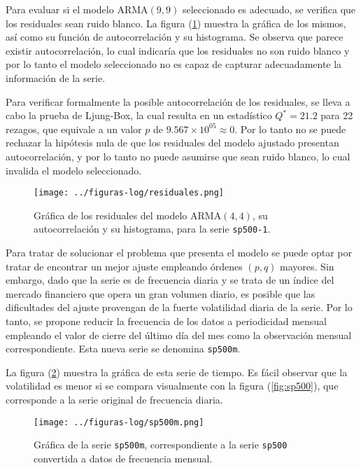 \documentclass{article}
\begin{document}
Para evaluar si el modelo $\mathrm{ARMA}(9, 9)$ seleccionado es adecuado, se verifica que los residuales sean ruido blanco. La figura (\ref{fig:residuales}) muestra la gráfica de los mismos, así como su función de autocorrelación y su histograma. Se observa que parece existir autocorrelación, lo cual indicaría que los residuales no son ruido blanco y por lo  tanto el modelo seleccionado no es capaz de capturar adecuadamente la información de la serie.

Para verificar formalmente la posible autocorrelación de los residuales, se lleva a cabo la prueba de Ljung-Box, la cual resulta en un estadístico $Q^* = 21.2$ para 22 rezagos, que equivale  a un valor $p$ de $9.567 \times 10^{05} \approx 0$. Por lo tanto no se puede rechazar la hipótesis nula de que los residuales del modelo ajustado presentan autocorrelación, y por lo tanto no puede asumirse que sean ruido blanco, lo cual invalida el modelo seleccionado.

\begin{figure}[H]
\centering
\texttt{[image: ../figuras-log/residuales.png]}
\caption{\label{fig:residuales}Gráfica de los residuales del modelo $\mathrm{ARMA(4, 4)}$, su autocorrelación y su histograma, para la serie \texttt{sp500-1}.}
\end{figure}

Para tratar de solucionar el problema que presenta el modelo se puede optar por tratar de encontrar un mejor ajuste empleando órdenes $(p, q)$ mayores. Sin embargo, dado que la serie es de frecuencia diaria y se trata de un índice del mercado financiero que opera un gran volumen diario, es posible que las dificultades del ajuste provengan de la fuerte volatilidad diaria de la serie. Por lo tanto, se propone reducir la frecuencia de los datos a periodicidad mensual empleando el valor de cierre del último día del mes como la observación mensual correspondiente. Esta nueva serie se denomina \texttt{sp500m}.

La figura (\ref{fig:sp500m}) muestra la gráfica de esta serie de tiempo. Es fácil observar que la volatilidad es menor si se compara visualmente con la figura (\ref{fig:sp500}), que corresponde a la serie original de frecuencia diaria.

\begin{figure}[H]
\centering
\texttt{[image: ../figuras-log/sp500m.png]}
\caption{\label{fig:sp500m}Gráfica de la serie \texttt{sp500m}, correspondiente a la serie \texttt{sp500} convertida a datos de frecuencia mensual.}
\end{figure}
\end{document}
